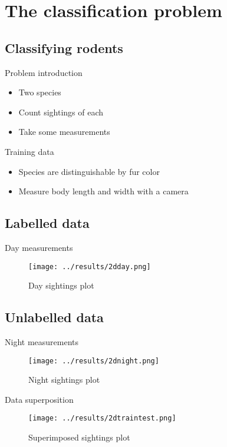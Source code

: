 \section{The classification problem}

\subsection{Classifying rodents}

\begin{frame}{Problem introduction}
  \begin{itemize}
    \item Two species
    \item Count sightings of each
    \item Take some measurements
  \end{itemize}
\end{frame}

\begin{frame}{Training data}
  \begin{itemize}
    \item Species are distinguishable by fur color
    \item Measure body length and width with a camera
  \end{itemize}
\end{frame}

\subsection{Labelled data}

\begin{frame}{Day measurements}
  \begin{figure}[!htbp]
    \centering
    \small{\caption{Day sightings plot}}
    \texttt{[image: ../results/2dday.png]}
  \end{figure}
\end{frame}

\subsection{Unlabelled data}

\begin{frame}{Night measurements}
  \begin{figure}[!htbp]
    \centering
    \small{\caption{Night sightings plot}}
    \texttt{[image: ../results/2dnight.png]}
  \end{figure}
\end{frame}

\begin{frame}{Data superposition}
  \begin{figure}[!htbp]
    \centering
    \small{\caption{Superimposed sightings plot}}
    \texttt{[image: ../results/2dtraintest.png]}
  \end{figure}
\end{frame}
